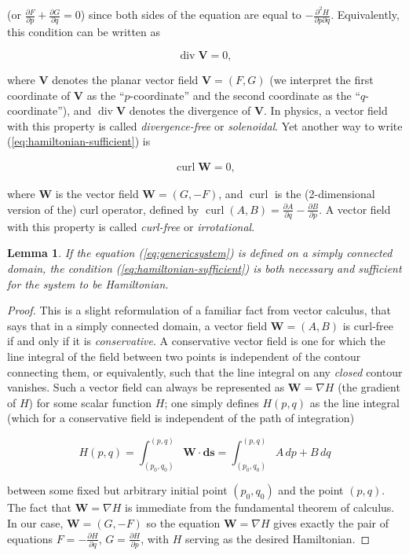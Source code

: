 \documentclass[11pt]{report}
\theoremstyle{plain}
\newtheorem{lem}[thm]{Lemma}
\theoremstyle{definition}
\begin{document}
(or
$\frac{\partial F}{\partial p} +\frac{\partial
G}{\partial q}=0$)
since both sides of the equation are equal to
$-\frac{\partial^2 H}{\partial p \partial q}$.
Equivalently, this condition can be written as

\[
\operatorname{div} \mathbf{V} = 0,
\]

where $\mathbf{V}$ denotes the planar vector field
$\mathbf{V}= (F,G)$ (we interpret the first
coordinate of $\mathbf{V}$ as the ``$p$-coordinate''
and the second coordinate as the ``$q$-coordinate''),
and $\operatorname{div} \mathbf{V}$ denotes the
divergence of $\mathbf{V}$. In physics, a vector
field with this property is called \emph{divergence-free}
or \emph{solenoidal}. Yet another way to write
(\ref{eq:hamiltonian-sufficient}) is

\begin{align*}
\operatorname{curl} \mathbf{W} = 0,
\end{align*}

where $\mathbf{W}$ is the vector field
$\mathbf{W}=(G,-F)$, and $\operatorname{curl}$ is the
(2-dimensional version of the) curl operator, defined
by
$\operatorname{curl}(A,B) = \frac{\partial
A}{\partial q}-\frac{\partial B}{\partial p}$.
A vector field with this property is called
\emph{curl-free} or \emph{irrotational}.

\begin{lem}
\label{lem:hamiltonian-div}
If the equation (\ref{eq:genericsystem}) is defined on a
simply connected domain, the condition
(\ref{eq:hamiltonian-sufficient}) is both necessary and
sufficient for the system to be Hamiltonian.
\end{lem}

\begin{proof}
This is a slight reformulation of a familiar fact
from vector calculus, that says that in a simply
connected domain, a vector field $\mathbf{W}=(A,B)$
is curl-free if and only if it is \emph{conservative}. A
conservative vector field is one for which the line
integral of the field between two points is
independent of the contour connecting them, or
equivalently, such that the line integral on any
\emph{closed} contour vanishes. Such a vector field can
always be represented as $\mathbf{W} = \nabla H$ (the
gradient of $H$) for some scalar function $H$; one
simply defines $H(p,q)$ as the line integral (which
for a conservative field is independent of the path of
integration)

\[
H(p,q) = \int_{(p_0,q_0)}^{(p,q)} \mathbf{W}\cdot \mathbf{ds} = \int_{(p_0,q_0)}^{(p,q)} A\,dp + B\,dq
\]

between some fixed but arbitrary initial point
$(p_0,q_0)$ and the point $(p,q)$. The fact that
$\mathbf{W}=\nabla H$ is immediate from the
fundamental theorem of calculus. In our case,
$\mathbf{W}=(G,-F)$ so the equation
$\mathbf{W}=\nabla H$ gives exactly the pair of
equations $F=-\frac{\partial H}{\partial q}$,
$G=\frac{\partial H}{\partial p}$, with $H$ serving
as the desired Hamiltonian.
\end{proof}
\end{document}
